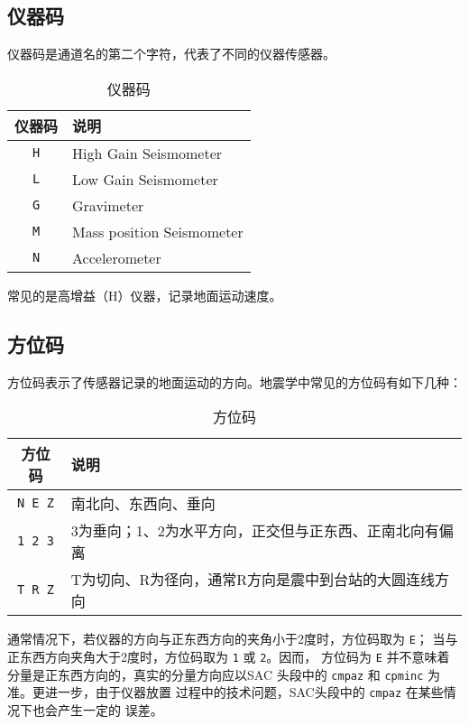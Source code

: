\subsection{仪器码}
仪器码是通道名的第二个字符，代表了不同的仪器传感器。
\begin{table}[H]
\centering
\caption{仪器码}
\begin{tabular}{cl}
\toprule
仪器码      &   说明   \\
\midrule
\texttt{H}  &   High Gain Seismometer      \\
\texttt{L}  &   Low Gain Seismometer       \\
\texttt{G}  &   Gravimeter                 \\
\texttt{M}  &   Mass position Seismometer  \\
\texttt{N}  &   Accelerometer              \\
\bottomrule
\end{tabular}
\end{table}
常见的是高增益（H）仪器，记录地面运动速度。

\subsection{方位码}
方位码表示了传感器记录的地面运动的方向。地震学中常见的方位码有如下几种：
\begin{table}[H]
\centering
\caption{方位码}
\begin{tabular}{cl}
\toprule
方位码           &   说明   \\
\midrule
\texttt{N E Z}   &   南北向、东西向、垂向   \\
\texttt{1 2 3}   &   3为垂向；1、2为水平方向，正交但与正东西、正南北向有偏离 \\
\texttt{T R Z}   &   T为切向、R为径向，通常R方向是震中到台站的大圆连线方向    \\
\bottomrule
\end{tabular}
\end{table}

通常情况下，若仪器的方向与正东西方向的夹角小于2度时，方位码取为 \texttt{E}；
当与正东西方向夹角大于2度时，方位码取为 \texttt{1} 或 \texttt{2}。因而，
方位码为 \texttt{E} 并不意味着分量是正东西方向的，真实的分量方向应以SAC
头段中的 \texttt{cmpaz} 和 \texttt{cpminc} 为准。更进一步，由于仪器放置
过程中的技术问题，SAC头段中的 \texttt{cmpaz} 在某些情况下也会产生一定的
误差。
